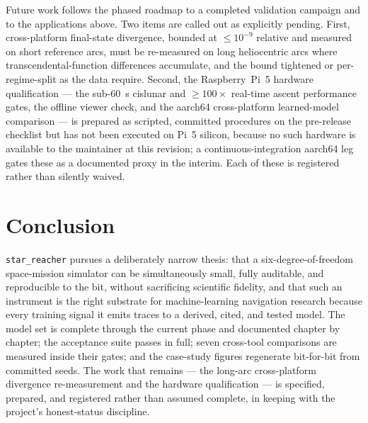\documentclass[10pt]{article}
\begin{document}
Future work follows the phased roadmap to a completed validation campaign and to
the applications above. Two items are called out as explicitly pending. First,
cross-platform final-state divergence, bounded at $\le\!10^{-9}$ relative and
measured on
short reference arcs, must be re-measured on long heliocentric arcs where
transcendental-function differences accumulate, and the bound tightened or
per-regime-split as the data require. Second, the Raspberry~Pi~5 hardware
qualification --- the sub-\SI{60}{\second} cislunar and $\ge\!100\times$
real-time ascent performance gates, the offline viewer check, and the aarch64
cross-platform learned-model comparison --- is prepared as scripted,
committed procedures on the pre-release checklist but has not been executed on
Pi~5 silicon, because no such hardware is available to the maintainer at this
revision; a continuous-integration aarch64 leg gates these as a documented
proxy in the interim. Each of these is registered rather than silently waived.

\section{Conclusion}
\label{sec:conclusion}

\texttt{star\_reacher} pursues a deliberately narrow thesis: that a
six-degree-of-freedom space-mission simulator can be simultaneously small,
fully auditable, and reproducible to the bit, without sacrificing scientific
fidelity, and that such an instrument is the right substrate for
machine-learning navigation research because every training signal it emits
traces to a derived, cited, and tested model. The model set is complete through
the current phase and documented chapter by chapter; the acceptance suite passes
in full; seven cross-tool comparisons are measured inside their gates; and the
case-study figures regenerate bit-for-bit from committed seeds. The work that
remains --- the long-arc cross-platform divergence re-measurement and the
hardware qualification --- is specified, prepared, and registered rather than
assumed complete, in keeping with the project's honest-status discipline.

\printbibliography
\end{document}
